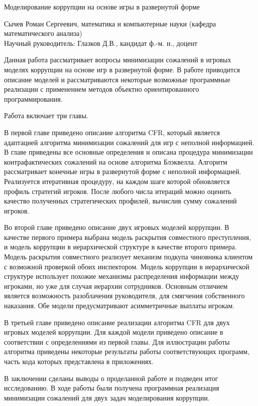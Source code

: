 {\Large Моделирование коррупции на основе игры в развернутой форме
\par}
{\large 
	Сычев Роман Сергеевич, математика  и компьютерные науки (кафедра математического анализа)\\
	Научный руководитель: Глазков Д.В., кандидат ф.-м. н., доцент
\par}
Данная работа рассматривает вопросы минимизации сожалений в игровых моделях коррупции на основе игр в развернутой форме. В работе приводится описание моделей и рассматриваются некоторые возможные программные реализации с применением методов объектно ориентированного программирования.
\par
Работа включает три главы. 
\par
В первой главе приведено описание алгоритма CFR, который является адаптацией алгоритма минимизации сожалений для игр с неполной информацией. В главе приведены все основные определения и описана процедура минимизации контрафактических сожалений на основе алгоритма Блэквелла. Алгоритм рассматривает конечные игры в развернутой форме с неполной информацией. Реализуется итеративная процедуру, на каждом шаге которой обновляется профиль стратегий игроков. После любого числа итераций можно оценить качество полученных стратегических профилей, вычислив сумму сожалений игроков.
\par
Во второй главе приведено описание двух игровых моделей коррупции. В качестве первого примера выбрана модель раскрытия совместного преступления, и модель коррупции в иерархической структуре в качестве второго примера. Модель раскрытия совместного реализует механизм подкупа чиновника клиентом с возможной проверкой обоих инспектором. Модель коррупции в иерархической структуре использует похожие механизмы распределения информации между игроками, но уже для случая иерархии сотрудников. Основным отличием является возможность разоблачения руководителя, для смягчения собственного наказания. Обе модели предусматривают асимметричные выплаты игрокам.
\par
В третьей главе приведено описание реализации алгоритма CFR для двух игровых моделей коррупции. Для каждой модели приведено описание в соответствии с определениями из первой главы. Для иллюстрации работы алгоритма приведены некоторые результаты работы соответствующих программ, часть кода которых представлена в приложениях.
\par
В заключении сделаны выводы о проделанной работе и подведен итог исследованию. В ходе работы были получена программная реализация минимизации сожалений для двух задач моделирования коррупции.